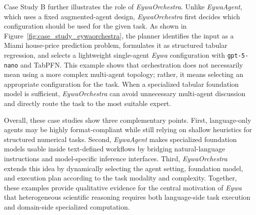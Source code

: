 \documentclass{llmxive}
\begin{document}
{Case Study B further illustrates the role of \textit{EywaOrchestra}. Unlike \textit{EywaAgent}, which uses a fixed augmented-agent design, \textit{EywaOrchestra} first decides which configuration should be used for the given task. As shown in Figure~\ref{fig:case_study_eywaorchestra}, the planner identifies the input as a Miami house-price prediction problem, formulates it as structured tabular regression, and selects a lightweight single-agent \textit{Eywa} configuration with \texttt{gpt-5-nano} and TabPFN. This example shows that orchestration does not necessarily mean using a more complex multi-agent topology; rather, it means selecting an appropriate configuration for the task. When a specialized tabular foundation model is sufficient, \textit{EywaOrchestra} can avoid unnecessary multi-agent discussion and directly route the task to the most suitable expert.

Overall, these case studies show three complementary points. First, language-only agents may be highly format-compliant while still relying on shallow heuristics for structured numerical tasks. Second, \textit{EywaAgent} makes specialized foundation models usable inside text-defined workflows by bridging natural-language instructions and model-specific inference interfaces. Third, \textit{EywaOrchestra} extends this idea by dynamically selecting the agent setting, foundation model, and execution plan according to the task modality and complexity. Together, these examples provide qualitative evidence for the central motivation of \textit{Eywa} that heterogeneous scientific reasoning requires both language-side task execution and domain-side specialized computation.



\begin{figure}[!htbp]
\centering
{}
\end{figure}}
\end{document}
